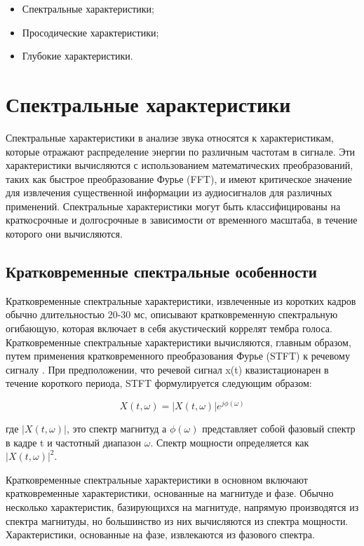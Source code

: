\begin{itemize}
    \item Спектральные характеристики;
    \item Просодические характеристики;
    \item Глубокие характеристики.
\end{itemize}

\section{Спектральные характеристики}

Спектральные характеристики в анализе звука относятся к характеристикам, которые отражают распределение энергии по различным частотам в сигнале. Эти характеристики вычисляются с использованием математических преобразований, таких как быстрое преобразование Фурье (FFT), и имеют критическое значение для извлечения существенной информации из аудиосигналов для различных применений. Спектральные характеристики могут быть классифицированы на краткосрочные и долгосрочные в зависимости от временного масштаба, в течение которого они вычисляются.

\subsection{Кратковременные спектральные особенности}

Кратковременные спектральные характеристики, извлеченные из коротких кадров обычно длительностью 20-30 мс, описывают кратковременную спектральную огибающую, которая включает в себя акустический коррелят тембра голоса. Кратковременные спектральные характеристики вычисляются, главным образом, путем применения кратковременного преобразования Фурье (STFT) к речевому сигналу \cite{xiao2015spoofing}. При предположении, что речевой сигнал x(t) квазистационарен в течение короткого периода, STFT формулируется следующим образом:


\begin{equation}
    X(t, \omega) = |X(t, \omega)| e^{j\phi(\omega)}
\end{equation}

где \(|X(t, \omega)|\), это спектр магнитуд а \(\phi(\omega)\) представляет собой фазовый спектр в кадре t и частотный диапазон \(\omega\). Спектр мощности определяется как \(|X(t, \omega)|^2\).

Кратковременные спектральные характеристики в основном включают кратковременные характеристики, основанные на магнитуде и фазе. Обычно несколько характеристик, базирующихся на магнитуде, напрямую производятся из спектра магнитуды, но большинство из них вычисляются из спектра мощности. Характеристики, основанные на фазе, извлекаются из фазового спектра.

